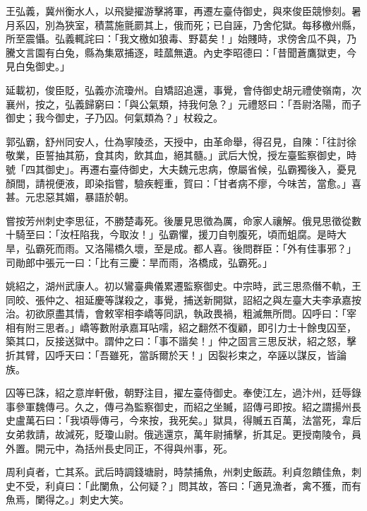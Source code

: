 \begin{pinyinscope}
 王弘義，冀州衡水人，以飛變擢游擊將軍，再遷左臺侍御史，與來俊臣競慘刻。暑月系囚，別為狹室，積蒿施氈罽其上，俄而死；已自誣，乃舍佗獄。每移檄州縣，所至震懾。弘義輒詫曰：「我文檄如狼毒、野葛矣！」始賤時，求傍舍瓜不與，乃騰文言園有白兔，縣為集眾捕逐，畦蓏無遺。內史李昭德曰：「昔聞蒼鷹獄吏，今見白兔御史。」



 延載初，俊臣貶，弘義亦流瓊州。自矯詔追還，事覺，會侍御史胡元禮使嶺南，次襄州，按之，弘義歸窮曰：「與公氣類，持我何急？」元禮怒曰：「吾尉洛陽，而子御史；我今御史，子乃囚。何氣類為？」杖殺之。



 郭弘霸，舒州同安人，仕為寧陵丞，天授中，由革命舉，得召見，自陳：「往討徐敬業，臣誓抽其筋，食其肉，飲其血，絕其髓。」武后大悅，授左臺監察御史，時號「四其御史」。再遷右臺侍御史，大夫魏元忠病，僚屬省候，弘霸獨後入，憂見顏間，請視便液，即染指嘗，驗疾輕重，賀曰：「甘者病不瘳，今味苦，當愈。」喜甚。元忠惡其媚，暴語於朝。



 嘗按芳州刺史李思征，不勝楚毒死。後屢見思徵為厲，命家人禳解。俄見思徵從數十騎至曰：「汝枉陷我，今取汝！」弘霸懼，援刀自刳腹死，頃而蛆腐。是時大旱，弘霸死而雨。又洛陽橋久壞，至是成。都人喜。後問群臣：「外有佳事邪？」司勛郎中張元一曰：「比有三慶：旱而雨，洛橋成，弘霸死。」



 姚紹之，湖州武康人。初以鸞臺典儀累遷監察御史。中宗時，武三思烝僭不軌，王同皎、張仲之、祖延慶等謀殺之，事覺，捕送新開獄，詔紹之與左臺大夫李承嘉按治。初欲原盡其情，會敕宰相李嶠等同訊，執政畏禍，粗滅無所問。囚呼曰：「宰相有附三思者。」嶠等數附承嘉耳呫嚅，紹之翻然不復顧，即引力士十餘曳囚至，築其口，反接送獄中。謂仲之曰：「事不諧矣！」仲之固言三思反狀，紹之怒，擊折其臂，囚呼天曰：「吾雖死，當訴爾於天！」因裂衫束之，卒誣以謀反，皆論族。



 囚等已誅，紹之意岸軒傲，朝野注目，擢左臺侍御史。奉使江左，過汴州，廷辱錄事參軍魏傳弓。久之，傳弓為監察御史，而紹之坐贓，詔傳弓即按。紹之謂揚州長史盧萬石曰：「我頃辱傳弓，今來按，我死矣。」獄具，得贓五百萬，法當死，韋后女弟救請，故減死，貶瓊山尉。俄逃還京，萬年尉捕擊，折其足。更授南陵令，員外置。開元中，為括州長史同正，不得與州事，死。



 周利貞者，亡其系。武后時調錢塘尉，時禁捕魚，州刺史飯蔬。利貞忽饋佳魚，刺史不受，利貞曰：「此闌魚，公何疑？」問其故，答曰：「適見漁者，禽不獲，而有魚焉，闌得之。」刺史大笑。




\end{pinyinscope}

